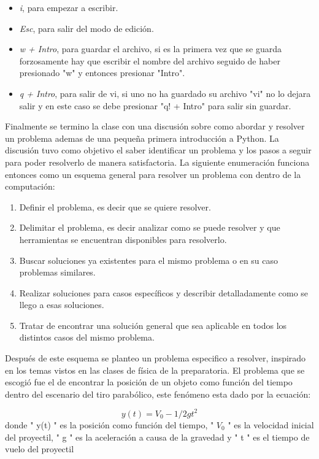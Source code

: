 \documentclass[letterpaper, 12pt, oneside]{article}
\begin{document}
	\begin{itemize}
		\item \textit{i}, para empezar a escribir.
		\item \textit{Esc}, para salir del modo de edición.
		\item \textit{w + Intro}, para guardar el archivo, si es la primera vez que se guarda forzosamente hay que escribir el nombre del archivo seguido de haber presionado "w" y entonces presionar "Intro".
		\item \textit{q + Intro}, para salir de vi, si uno no ha guardado su archivo "vi" no lo dejara salir y en este caso se debe presionar "q! + Intro" para salir sin guardar.
	\\
	\end{itemize}
	Finalmente se termino la clase con una discusión sobre como abordar y resolver un problema ademas de una pequeña primera introducción a Python. La discusión tuvo como objetivo el saber identificar un problema y los pasos a seguir para poder resolverlo de manera satisfactoria. La siguiente enumeración funciona entonces como un esquema general para resolver un problema con dentro de la computación:
	\begin{enumerate}
		\item Definir el problema, es decir que se quiere resolver.
		\item Delimitar el problema, es decir analizar como se puede resolver y que herramientas se encuentran disponibles para resolverlo.
		\item Buscar soluciones ya existentes para el mismo problema o en su caso problemas similares.
		\item Realizar soluciones para casos específicos y describir detalladamente como se llego a esas soluciones.
		\item Tratar de encontrar una solución general que sea aplicable en todos los distintos casos del mismo problema.
	\\
	\end{enumerate}
	Después de este esquema se planteo un problema especifico a resolver, inspirado en los temas vistos en las clases de física de la preparatoria. El problema que se escogió fue el de encontrar la posición de un objeto como función del tiempo dentro del escenario del tiro parabólico, este fenómeno esta dado por la ecuación:
	
		\textit{\[y(t) = V_{0} - 1/2gt^{2}\]}donde " y(t) " es la posición como función del tiempo, " $V_{0}$ " es la velocidad inicial del proyectil, " g " es la aceleración a causa de la gravedad y " t " es el tiempo de vuelo del proyectil
	\\
	
\end{document}

